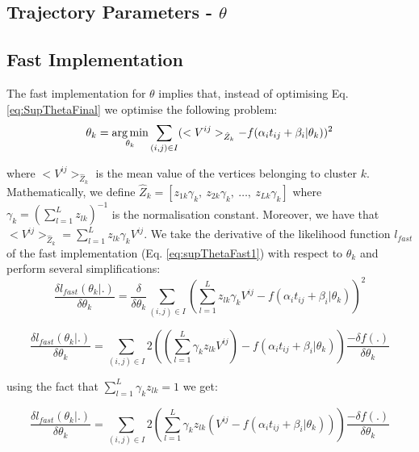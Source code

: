 \subsection{Trajectory Parameters - $\theta$}

\subsection{Fast Implementation}

The fast implementation for $\theta$ implies that, instead of optimising Eq. \ref{eq:SupThetaFinal} we optimise the following problem:
\begin{equation}
\label{eq:supThetaFast1}
 \theta_k = \operatorname*{arg\,min}_{\theta_k} \sum_{(i,j) \in I} (<V^{ij}>_{\hat{Z}_k} - f(\alpha_i t_{ij} + \beta_i | \theta_k))^2
\end{equation}

where $<V^{ij}>_{\hat{Z}_k}$ is the mean value of the vertices belonging to cluster $k$. Mathematically, we define $\hat{Z}_k = [z_{1k}\gamma_k,\ z_{2k}\gamma_k,\ \dots,\ z_{Lk}\gamma_k ]$ where  $\gamma_k = (\sum_{l=1}^L z_{lk})^{-1}$ is the normalisation constant. Moreover, we have that ${<V^{ij}>_{\hat{Z}_k} = \sum_{l=1}^L z_{lk} \gamma_k V^{ij}}$. We take the derivative of the likelihood function $l_{fast}$ of the fast implementation (Eq. \ref{eq:supThetaFast1}) with respect to $\theta_k$ and perform several simplifications:
\begin{equation}
\frac{\delta l_{fast}(\theta_k|.)}{\delta \theta_k} = \frac{\delta}{\delta \theta_k} \sum_{(i,j) \in I} \left( \sum_{l=1}^L z_{lk} \gamma_k V^{ij} - f(\alpha_i t_{ij} + \beta_i | \theta_k) \right)^2
\end{equation}

\begin{equation}
\frac{\delta l_{fast}(\theta_k|.)}{\delta \theta_k} = \sum_{(i,j) \in I} 2 \left( \left( \sum_{l=1}^L \gamma_k z_{lk} V^{ij} \right) - f(\alpha_i t_{ij} + \beta_i | \theta_k) \right) \frac{-\delta f(.)}{\delta \theta_k}
\end{equation}

using the fact that $\sum_{l=1}^L \gamma_k z_{lk} = 1$ we get:

\begin{equation}
\frac{\delta l_{fast}(\theta_k|.)}{\delta \theta_k} = \sum_{(i,j) \in I} 2 \left( \sum_{l=1}^L \gamma_k z_{lk} \left( V^{ij} - f(\alpha_i t_{ij} + \beta_i | \theta_k) \right) \right) \frac{-\delta f(.)}{\delta \theta_k}
\end{equation}

